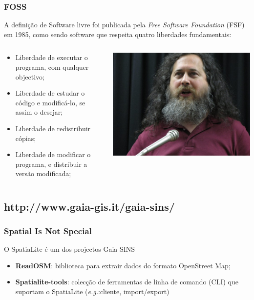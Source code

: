 \documentclass[hyperref={pdfpagelabels=true}]{beamer}
\begin{document}
\begin{frame}
\frametitle{FOSS}
A defini\c{c}\~{a}o de Software livre foi publicada pela \textit{Free Software Foundation} (FSF) em 1985, como sendo software que respeita quatro liberdades fundamentais:
\begin{columns}
  \begin{column}{7cm}
    \begin{itemize}
      \item<2-> Liberdade de executar o programa, com qualquer objectivo;
      \item<3-> Liberdade de estudar o c\'{o}digo e modific\'{a}-lo, se assim o desejar;
      \item<4-> Liberdade de redistribuir c\'{o}pias;
      \item<5-> Liberdade de modificar o programa, e distribuir a vers\~{a}o modificada;      
    \end{itemize}    
  \end{column}
  \begin{column}{10cm}
    \includegraphics[scale=0.3]{stallman.jpg}   
  \end{column}  
\end{columns} 
\end{frame}

\subsection{http://www.gaia-gis.it/gaia-sins/}
\begin{frame}
\frametitle{Spatial Is Not Special}
O SpatiaLite \'{e} um dos projectos {Gaia-SINS}
    \begin{itemize}
      \item<2-> \textbf{ReadOSM}: biblioteca para extrair dados do formato OpenStreet Map;
      \item<3-> \textbf{Spatialite-tools}: colec\c{c}\~{a}o de ferramentas de linha de comando (CLI) que suportam o SpatiaLite (\textit{e.g.}:cliente, import/export)
    \end{itemize}
\end{frame}
\end{document}
